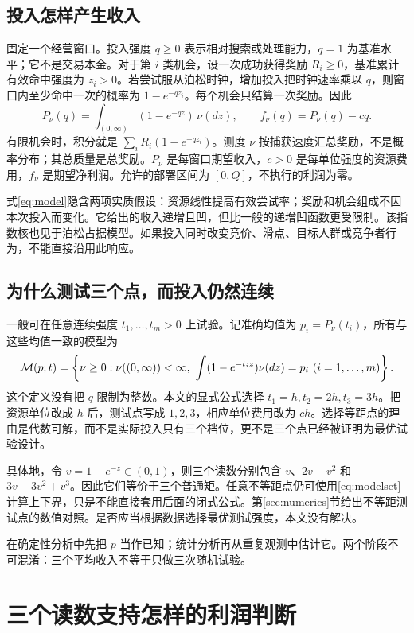 \subsection{投入怎样产生收入}
固定一个经营窗口。投入强度 $q\geq0$ 表示相对搜索或处理能力，$q=1$ 为基准水平；它不是交易本金。对于第 $i$ 类机会，设一次成功获得奖励 $R_i\geq0$，基准累计有效命中强度为 $z_i>0$。若尝试服从泊松时钟，增加投入把时钟速率乘以 $q$，则窗口内至少命中一次的概率为 $1-e^{-qz_i}$。每个机会只结算一次奖励。因此
\begin{equation}\label{eq:model}
 P_\nu(q)=\int_{(0,\infty)}(1-e^{-qz})\,\nu(dz),
 \qquad f_\nu(q)=P_\nu(q)-cq.
\end{equation}
有限机会时，积分就是 $\sum_i R_i(1-e^{-qz_i})$。测度 $\nu$ 按捕获速度汇总奖励，不是概率分布；其总质量是总奖励。$P_\nu$ 是每窗口期望收入，$c>0$ 是每单位强度的资源费用，$f_\nu$ 是期望净利润。允许的部署区间为 $[0,Q]$，不执行的利润为零。

式\eqref{eq:model}隐含两项实质假设：资源线性提高有效尝试率；奖励和机会组成不因本次投入而变化。它给出的收入递增且凹，但比一般的递增凹函数更受限制。该指数核也见于泊松占据模型\cite{gnedin}。如果投入同时改变竞价、滑点、目标人群或竞争者行为，不能直接沿用此响应。

\subsection{为什么测试三个点，而投入仍然连续}
一般可在任意连续强度 $t_1,\ldots,t_m>0$ 上试验。记准确均值为 $p_i=P_\nu(t_i)$，所有与这些均值一致的模型为
\begin{equation}\label{eq:modelset}
 \mathcal M(p;t)=\left\{\nu\geq0:\nu((0,\infty))<\infty,
 \ \int(1-e^{-t_i z})\nu(dz)=p_i\ (i=1,\ldots,m)\right\}.
\end{equation}
这个定义没有把 $q$ 限制为整数。本文的显式公式选择 $t_1=h,t_2=2h,t_3=3h$。把资源单位改成 $h$ 后，测试点写成 $1,2,3$，相应单位费用改为 $ch$。选择等距点的理由是代数可解，而不是实际投入只有三个档位，更不是三个点已经被证明为最优试验设计。

具体地，令 $v=1-e^{-z}\in(0,1)$，则三个读数分别包含 $v$、$2v-v^2$ 和 $3v-3v^2+v^3$。因此它们等价于三个普通矩。任意不等距点仍可使用\eqref{eq:modelset}计算上下界，只是不能直接套用后面的闭式公式。第\ref{sec:numerics}节给出不等距测试点的数值对照。是否应当根据数据选择最优测试强度，本文没有解决。

在确定性分析中先把 $p$ 当作已知；统计分析再从重复观测中估计它。两个阶段不可混淆：三个平均收入不等于只做三次随机试验。

\section{三个读数支持怎样的利润判断}
